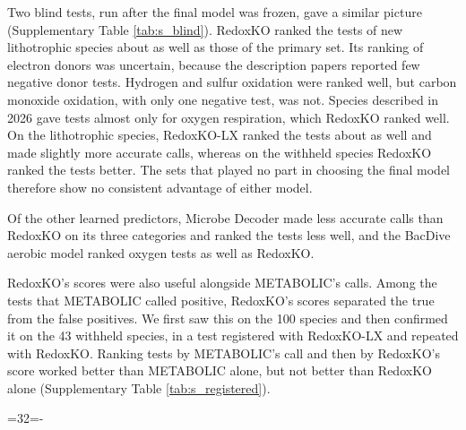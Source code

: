 \documentclass[10pt,a4paper,onecolumn]{article}
\begin{document}
Two blind tests, run after the final model was frozen, gave a similar
picture (Supplementary Table \ref{tab:s_blind}). RedoxKO ranked the
tests of new lithotrophic species about as well as those of the primary
set. Its ranking of electron donors was uncertain, because the
description papers reported few negative donor tests. Hydrogen and
sulfur oxidation were ranked well, but carbon monoxide oxidation, with
only one negative test, was not. Species described in 2026 gave tests
almost only for oxygen respiration, which RedoxKO ranked well. On the
lithotrophic species, RedoxKO-LX ranked the tests about as well and made
slightly more accurate calls, whereas on the withheld species RedoxKO
ranked the tests better. The sets that played no part in choosing the
final model therefore show no consistent advantage of either model.

Of the other learned predictors, Microbe Decoder made less accurate
calls than RedoxKO on its three categories and ranked the tests less
well, and the BacDive aerobic model ranked oxygen tests as well as
RedoxKO.

RedoxKO's scores were also useful alongside METABOLIC's calls. Among the
tests that METABOLIC called positive, RedoxKO's scores separated the
true from the false positives. We first saw this on the 100 species and
then confirmed it on the 43 withheld species, in a test registered with
RedoxKO-LX and repeated with RedoxKO. Ranking tests by METABOLIC's call
and then by RedoxKO's score worked better than METABOLIC alone, but not
better than RedoxKO alone (Supplementary Table \ref{tab:s_registered}).

\par

\begingroup{}=32\baselineskip{}=\pagegoal\advance{}-\pagetotal\ifdim\dimen0>\dimen2\ifdim\dimen2>0pt\vfil\fi{}\fi\endgroup

\begingroup\small{}\renewcommand{\arraystretch}{1.25}
\end{document}

